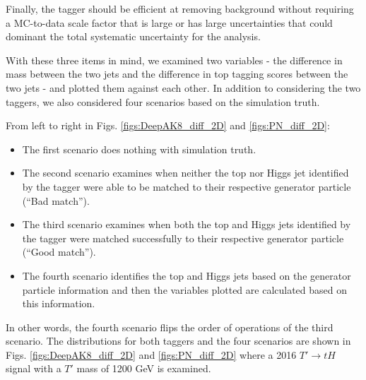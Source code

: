 \documentclass[10pt,oneside]{article}
\begin{document}
Finally, the tagger should be efficient at removing background without requiring a 
MC-to-data scale factor that is large or has large uncertainties that could dominant
the total systematic uncertainty for the analysis.

With these three items in mind, we examined two variables - the difference in mass
between the two jets and the difference in top tagging scores between the two jets
- and plotted them against each other. In addition to considering the two taggers,
we also considered four scenarios based on the simulation truth.

From left to right in Figs. \ref{figs:DeepAK8_diff_2D} and \ref{figs:PN_diff_2D}:
\begin{itemize}
    \item The first scenario does nothing with simulation truth.
    \item The second scenario examines when neither the top nor Higgs jet identified by the
          tagger were able to be matched to their respective generator particle (``Bad match'').
    \item The third scenario examines when both the top and Higgs jets identified by the tagger
          were matched successfully to their respective generator particle (``Good match'').
    \item The fourth scenario identifies the top and Higgs jets based on the generator particle
          information and then the variables plotted are calculated based on this information.
\end{itemize}

In other words, the fourth scenario flips the order of operations of the third scenario.
The distributions for both taggers and the four scenarios are shown in Figs.
\ref{figs:DeepAK8_diff_2D} and \ref{figs:PN_diff_2D} where a 2016 $T' \to tH$ signal with
a $T'$ mass of 1200 GeV is examined.
\end{document}
